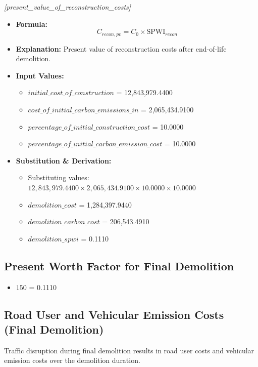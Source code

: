 \documentclass[12pt,a4paper]{article}
\begin{document}
\textit{[present\_value\_of\_reconstruction\_costs]}

\begin{itemize}
  \item \textbf{Formula:} $$C_{recon,pv} = C_0 \times \text{SPWI}_{recon}$$
  \item \textbf{Explanation:} Present value of reconstruction costs after end-of-life demolition.
  \item \textbf{Input Values:}
  \begin{itemize}
    \item $initial\_cost\_of\_construction$ = 12,843,979.4400
    \item $cost\_of\_initial\_carbon\_emissions\_in$ = 2,065,434.9100
    \item $percentage\_of\_initial\_construction\_cost$ = 10.0000
    \item $percentage\_of\_initial\_carbon\_emission\_cost$ = 10.0000
  \end{itemize}
  \item \textbf{Substitution \& Derivation:}
  \begin{itemize}
    \item Substituting values: $12,843,979.4400 \times 2,065,434.9100 \times 10.0000 \times 10.0000$
    \item $demolition\_cost$ = 1,284,397.9440
    \item $demolition\_carbon\_cost$ = 206,543.4910
    \item $demolition\_spwi$ = 0.1110
  \end{itemize}
\end{itemize}


\subsection{Present Worth Factor for Final Demolition}

\begin{itemize}
  \item $150$ = 0.1110
\end{itemize}

\subsection{Road User and Vehicular Emission Costs (Final Demolition)}

Traffic disruption during final demolition results in road user costs and vehicular emission costs over the demolition duration.
\end{document}
